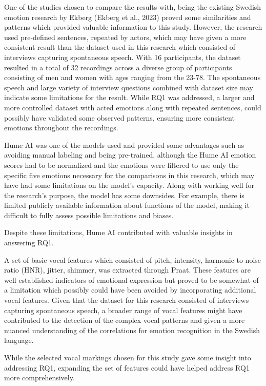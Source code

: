 One of the studies chosen to compare the results with, being the existing Swedish emotion research by Ekberg (Ekberg et al., 2023) proved some similarities and patterns which provided valuable information to this study.  However, the research used pre-defined sentences, repeated by actors, which may have given a more consistent result than the dataset used in this research which consisted of interviews capturing spontaneous speech. With 16 participants, the dataset resulted in a total of 32 recordings across a diverse group of participants consisting of men and women with ages ranging from the 23-78. The spontaneous speech and large variety of interview questions combined with dataset size may indicate some limitations for the result. While RQ1 was addressed, a larger and more controlled dataset with acted emotions along with repeated sentences, could possibly have validated some observed patterns, ensuring more consistent emotions throughout the recordings.

Hume AI was one of the models used and provided some advantages such as avoiding manual labeling and being pre-trained, although the Hume AI emotion scores had to be normalized and the emotions were filtered to use only the specific five emotions necessary for the comparisons in this research, which may have had some limitations on the model’s capacity. Along with working well for the research’s purpose, the model has some downsides. For example, there is limited publicly available information about functions of the model, making it difficult to fully assess possible limitations and biases.

Despite these limitations, Hume AI contributed with valuable insights in answering RQ1. 

A set of basic vocal features which consisted of pitch, intensity, harmonic-to-noise ratio (HNR), jitter, shimmer, was extracted through Praat. These features are well established indicators of emotional expression but proved to be somewhat of a limitation which possibly could have been avoided by incorporating additional vocal features. Given that the dataset for this research consisted of interviews capturing spontaneous speech, a broader range of vocal features might have contributed to the detection of the complex vocal patterns and given a more nuanced understanding of the correlations for emotion recognition in the Swedish language.

While the selected vocal markings chosen for this study gave some insight into addressing RQ1, expanding the set of features could have helped address RQ1 more comprehensively. 

